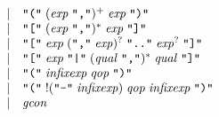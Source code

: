 \begin{align*}
\begin{array}{rcl}
    & \mid & \text{\texttt{\textquotedbl(\textquotedbl}}\; (\mathit{exp}\; \text{\texttt{\textquotedbl,\textquotedbl}})^+\; \mathit{exp}\; \text{\texttt{\textquotedbl)\textquotedbl}} \\
    & \mid & \text{\texttt{\textquotedbl[\textquotedbl}}\; (\mathit{exp}\; \text{\texttt{\textquotedbl,\textquotedbl}})^*\; \mathit{exp}\; \text{\texttt{\textquotedbl]\textquotedbl}} \\
    & \mid & \text{\texttt{\textquotedbl[\textquotedbl}}\; \mathit{exp}\; (\text{\texttt{\textquotedbl,\textquotedbl}}\; \mathit{exp})^?\; \text{\texttt{\textquotedbl..\textquotedbl}}\; \mathit{exp}^?\; \text{\texttt{\textquotedbl]\textquotedbl}} \\
    & \mid & \text{\texttt{\textquotedbl[\textquotedbl}}\; \mathit{exp}\; \text{\texttt{\textquotedbl|\textquotedbl}}\; (\mathit{qual}\; \text{\texttt{\textquotedbl,\textquotedbl}})^*\; \mathit{qual}\; \text{\texttt{\textquotedbl]\textquotedbl}} \\
    & \mid & \text{\texttt{\textquotedbl(\textquotedbl}}\; \mathit{infixexp}\; \mathit{qop}\; \text{\texttt{\textquotedbl)\textquotedbl}} \\
    & \mid & \text{\texttt{\textquotedbl(\textquotedbl}}\; ! (\text{\texttt{\textquotedbl-\textquotedbl}}\; \mathit{infixexp})\; \mathit{qop}\; \mathit{infixexp}\; \text{\texttt{\textquotedbl)\textquotedbl}} \\
    & \mid & \mathit{gcon}
  \end{array}
\end{align*}

